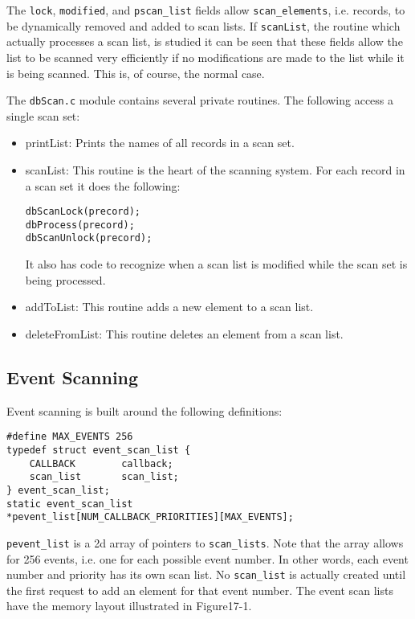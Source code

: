 The \verb|lock|, \verb|modified|, and \verb|pscan_list| fields allow \verb|scan_elements|, i.e. records, to be dynamically removed and 
added to scan lists. If \verb|scanList|, the routine which actually processes a scan list, is studied it can be seen that these fields 
allow the list to be scanned very efficiently if no modifications are made to the list while it is being scanned. This is, of 
course, the normal case.

The \verb|dbScan.c| module contains several private routines. The following access a single scan set: 

\begin{itemize}\item printList:  Prints the names of all records in a scan set.

\item scanList:  This routine is the heart of the scanning system. For each record in a scan set it does the following:

\begin{verbatim}dbScanLock(precord);
dbProcess(precord);
dbScanUnlock(precord);
\end{verbatim}

It also has code to recognize when a scan list is modified while the scan set is being processed.

\item addToList:  This routine adds a new element to a scan list.

\item deleteFromList:  This routine deletes an element from a scan list.

\end{itemize}

\subsection{Event Scanning}

Event scanning is built around the following definitions:

\begin{verbatim}#define MAX_EVENTS 256
typedef struct event_scan_list {
    CALLBACK        callback;
    scan_list       scan_list;
} event_scan_list;
static event_scan_list
*pevent_list[NUM_CALLBACK_PRIORITIES][MAX_EVENTS];
\end{verbatim}\verb|pevent_list| is a 2d array of pointers to \verb|scan_lists|. Note that the array allows for 256 events, i.e. one for each 
possible event number. In other words, each event number and priority has its own scan list. No \verb|scan_list| is actually 
created until the first request to add an element for that event number. The event scan lists have the memory layout 
illustrated in Figure17-1.

